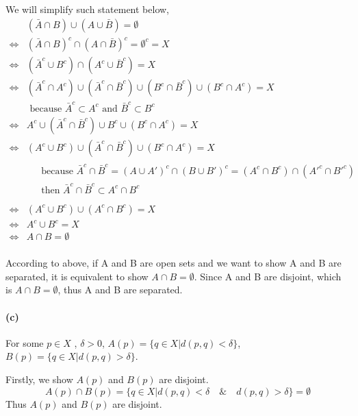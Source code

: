 \documentclass{article}
\begin{document}
We will simplify such statement below,
\begin{equation}
  \begin{split}
    & (\bar{A} \cap B)  \cup  (A \cup \bar{B}) = \emptyset \\
    \Leftrightarrow & (\bar{A} \cap B)^c  \cap  (A \cap \bar{B})^c = \emptyset^c = X \\
    \Leftrightarrow & (\bar{A}^c \cup B^c)  \cap  (A^c \cup \bar{B}^c) = X \\
    \Leftrightarrow & (\bar{A}^c \cap A^c) \cup (\bar{A}^c \cap \bar{B}^c) \cup (B^c \cap \bar{B}^c) \cup (B^c \cap A^c) = X \\
    &\text{ because } \bar{A}^c \subset A^c \text{ and } \bar{B}^c \subset B^c \\
    \Leftrightarrow & A^c \cup (\bar{A}^c \cap \bar{B}^c) \cup B^c \cup (B^c \cap A^c) = X \\
    \Leftrightarrow & (A^c \cup B^c) \cup (\bar{A}^c \cap \bar{B}^c) \cup (B^c \cap A^c) = X \\
    &\begin{split}
      &\text{ because } \bar{A}^c \cap \bar{B}^c = (A \cup A')^c \cap (B \cup B')^c = (A^c \cap B^c) \cap (A'^c \cap B'^c)\\
      & \text{ then } \bar{A}^c \cap \bar{B}^c \subset A^c \cap B^c\\
    \end{split}\\
    \Leftrightarrow & (A^c \cup B^c) \cup (A^c \cap B^c) = X \\
    \Leftrightarrow & A^c \cup B^c = X \\
    \Leftrightarrow & A \cap B = \emptyset \\
  \end{split}
\end{equation}

According to above, if A and B are open sets  and we want to show A and B are separated, it is equivalent to show $A \cap B = \emptyset $.
Since A and B are disjoint, which is $A \cap B = \emptyset $, thus A and B are separated.

\paragraph{(c)}
For some $ p \in X$ , $\delta >0$,
$A(p) = \{ q\in X | d(p,q) < \delta \}$,
$B(p) = \{ q\in X | d(p,q) > \delta \}$.

Firstly, we show $A(p)$ and $B(p)$ are disjoint.
$$ A(p) \cap B(p) = \{ q \in X | d(p,q)< \delta \quad \& \quad d(p,q) >\delta \} = \emptyset $$
Thus  $A(p)$ and $B(p)$ are disjoint.
\end{document}
